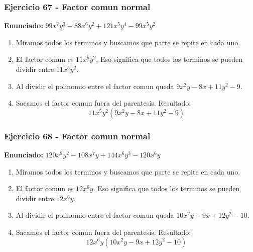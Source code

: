 \documentclass[11pt,a4paper]{article}
\begin{document}
\subsubsection*{Ejercicio 67 - Factor comun normal}
\textbf{Enunciado:} $ 99 x^{7} y^{3} - 88 x^{6} y^{2} + 121 x^{5} y^{4} - 99 x^{5} y^{2} $\par
\begin{enumerate}[leftmargin=2em]
\item Miramos todos los terminos y buscamos que parte se repite en cada uno.
\item El factor comun es \(11 x^{5} y^{2}\). Eso significa que todos los terminos se pueden dividir entre \(11 x^{5} y^{2}\).
\item Al dividir el polinomio entre el factor comun queda \(9 x^{2} y - 8 x + 11 y^{2} - 9\).
\item Sacamos el factor comun fuera del parentesis. Resultado: \[\boxed{11 x^{5} y^{2}\left(9 x^{2} y - 8 x + 11 y^{2} - 9\right)}\]
\end{enumerate}

\vspace{0.2cm}
\subsubsection*{Ejercicio 68 - Factor comun normal}
\textbf{Enunciado:} $ 120 x^{8} y^{2} - 108 x^{7} y + 144 x^{6} y^{3} - 120 x^{6} y $\par
\begin{enumerate}[leftmargin=2em]
\item Miramos todos los terminos y buscamos que parte se repite en cada uno.
\item El factor comun es \(12 x^{6} y\). Eso significa que todos los terminos se pueden dividir entre \(12 x^{6} y\).
\item Al dividir el polinomio entre el factor comun queda \(10 x^{2} y - 9 x + 12 y^{2} - 10\).
\item Sacamos el factor comun fuera del parentesis. Resultado: \[\boxed{12 x^{6} y\left(10 x^{2} y - 9 x + 12 y^{2} - 10\right)}\]
\end{enumerate}

\vspace{0.2cm}
\end{document}
